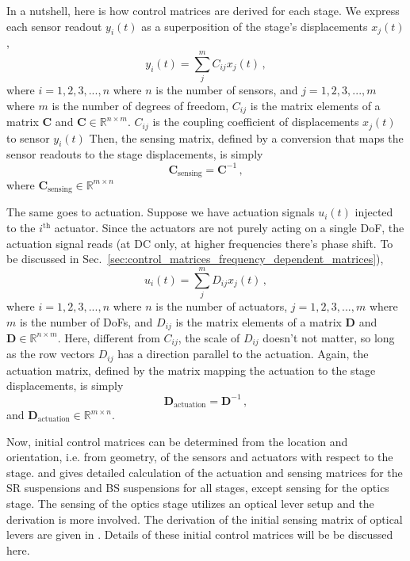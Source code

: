In a nutshell, here is how control matrices are derived for each stage.
We express each sensor readout $y_i(t)$ as a superposition of the stage's displacements $x_j(t)$,
\begin{equation}
	y_i(t) = \sum_j^m C_{ij} x_j(t)\,,
\end{equation}
where $i=1,2,3,...,n$ where $n$ is the number of sensors, and $j=1,2,3,...,m$ where $m$ is the number of degrees of freedom, $C_{ij}$ is the matrix elements of a matrix $\mathbf{C}$ and $\mathbf{C}\in \mathbb{R}^{n\times m}$.
$C_{ij}$ is the coupling coefficient of displacements $x_j(t)$ to sensor  $y_i(t)$
Then, the sensing matrix, defined by a conversion that maps the sensor readouts to the stage displacements, is simply
\begin{equation}
	\mathbf{C}_{\mathrm{sensing}} = \mathbf{C}^{-1}\,,
\end{equation}
where $\mathbf{C}_\mathrm{sensing} \in \mathbb{R}^{m\times n}$

The same goes to actuation.
Suppose we have actuation signals $u_i(t)$ injected to the $i^\mathrm{th}$ actuator.
Since the actuators are not purely acting on a single DoF, the actuation signal reads (at DC only, at higher frequencies there's phase shift. To be discussed in Sec.~\ref{sec:control_matrices_frequency_dependent_matrices}),
\begin{equation}
	u_i(t) = \sum_j^m D_{ij} x_j(t)\,,
\end{equation}
where $i=1,2,3,...,n$ where $n$ is the number of actuators, $j=1,2,3,...,m$ where $m$ is the number of DoFs, and $D_{ij}$ is the matrix elements of a matrix $\mathbf{D}$ and $\mathbf{D}\in \mathbb{R}^{n\times m}$.
Here, different from $C_{ij}$, the scale of $D_{ij}$ doesn't not matter, so long as the row vectors $D_{ij}$ has a direction parallel to the actuation.
Again, the actuation matrix, defined by the matrix mapping the actuation to the stage displacements, is simply
\begin{equation}
	\mathbf{D}_\mathrm{actuation} = \mathbf{D}^{-1}\,,
\end{equation}
and $\mathbf{D}_\mathrm{actuation}\in\mathbb{R}^{m\times n}$.

Now, initial control matrices can be determined from the location and orientation, i.e. from geometry, of the sensors and actuators with respect to the stage.
\cite{sr_suspension_diagonalization} and \cite{bs_suspension_diagonalization} gives detailed calculation of the actuation and sensing matrices for the SR suspensions and BS suspensions for all stages, except sensing for the optics stage.
The sensing of the optics stage utilizes an optical lever setup and the derivation is more involved.
The derivation of the initial sensing matrix of optical levers are given in \cite{sensing_matrices_oplev}.
Details of these initial control matrices will be be discussed here.

